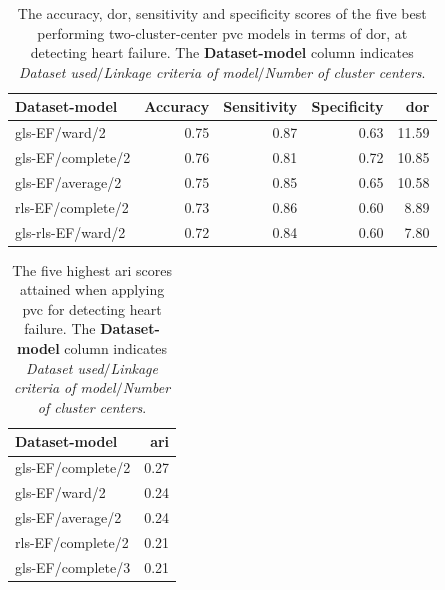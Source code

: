 \begin{table}[htb]
    \centering
    \begin{tabular}{lrrrr}
        \toprule
        Dataset-model    &  Accuracy &  Sensitivity &  Specificity &   \acrshort{dor} \\
        \midrule
        gls-EF/ward/2     &      0.75 &         0.87 &         0.63 & 11.59 \\
        gls-EF/complete/2 &      0.76 &         0.81 &         0.72 & 10.85 \\
        gls-EF/average/2  &      0.75 &         0.85 &         0.65 & 10.58 \\
        rls-EF/complete/2 &      0.73 &         0.86 &         0.60 &  8.89 \\
        gls-rls-EF/ward/2 &      0.72 &         0.84 &         0.60 &  7.80 \\
        \bottomrule
    \end{tabular}
    \caption{The accuracy, \acrshort{dor}, sensitivity and specificity scores of the five best performing two-cluster-center \acrshort{pvc} models in terms of \acrshort{dor}, at detecting heart failure.
             The \textbf{Dataset-model} column indicates \textit{Dataset used}$/$\textit{Linkage criteria of model}$/$\textit{Number of cluster centers}.}
    \label{tab:pvc_hf_dor_sens_spec_dist}
\end{table}

\begin{table}[htb]
    \centering
    \begin{tabular}{lr}
        \toprule
        Dataset-model    &  \acrshort{ari} \\
        \midrule
        gls-EF/complete/2 & 0.27 \\
        gls-EF/ward/2     & 0.24 \\
        gls-EF/average/2  & 0.24 \\
        rls-EF/complete/2 & 0.21 \\
        gls-EF/complete/3 & 0.21 \\
        \bottomrule
    \end{tabular}
    \caption{The five highest \acrshort{ari} scores attained when applying \acrshort{pvc} for detecting heart failure.
             The \textbf{Dataset-model} column indicates \textit{Dataset used}$/$\textit{Linkage criteria of model}$/$\textit{Number of cluster centers}.}
    \label{tab:pvc_hf_ari}
\end{table}

